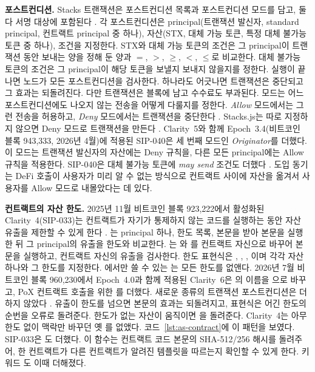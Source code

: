 \textbf{포스트컨디션.} Stacks 트랜잭션은 포스트컨디션 목록과 포스트컨디션 모드를 담고, 둘 다 서명 대상에 포함된다 \cite{sip005}. 각 포스트컨디션은 principal(트랜잭션 발신자, standard principal, 컨트랙트 principal 중 하나), 자산(STX, 대체 가능 토큰, 특정 대체 불가능 토큰 중 하나), 조건을 지정한다. STX와 대체 가능 토큰의 조건은 그 principal이 트랜잭션 동안 보내는 양을 정해 둔 양과 $=$, $>$, $\geq$, $<$, $\leq$로 비교한다. 대체 불가능 토큰의 조건은 그 principal이 해당 토큰을 보낼지 보내지 않을지를 정한다. 실행이 끝나면 노드가 모든 포스트컨디션을 검사한다. 하나라도 어긋나면 트랜잭션은 중단되고 그 효과는 되돌려진다. 다만 트랜잭션은 블록에 남고 수수료도 부과된다. 모드는 어느 포스트컨디션에도 나오지 않는 전송을 어떻게 다룰지를 정한다. \emph{Allow} 모드에서는 그런 전송을 허용하고, \emph{Deny} 모드에서는 트랜잭션을 중단한다 \cite{sip005}. Stacks.js는 따로 지정하지 않으면 Deny 모드로 트랜잭션을 만든다 \cite{hiropostconditions}. Clarity~5와 함께 Epoch~3.4(비트코인 블록 943,333, 2026년 4월)에 적용된 SIP-040은 세 번째 모드인 \emph{Originator}를 더했다. 이 모드는 트랜잭션 발신자의 자산에는 Deny 규칙을, 다른 모든 principal에는 Allow 규칙을 적용한다. SIP-040은 대체 불가능 토큰에 \emph{may send} 조건도 더했다 \cite{sip040,sip039}. 도입 동기는 DeFi 호출이 사용자가 미리 알 수 없는 방식으로 컨트랙트 사이에 자산을 옮겨서 사용자를 Allow 모드로 내몰았다는 데 있다.

\textbf{컨트랙트의 자산 한도.} 2025년 11월 비트코인 블록 923,222에서 활성화된 Clarity~4(SIP-033)는 컨트랙트가 자기가 통제하지 않는 코드를 실행하는 동안 자산 유출을 제한할 수 있게 한다 \cite{sip033}. 는 principal 하나, 한도 목록, 본문을 받아 본문을 실행한 뒤 그 principal의 유출을 한도와 비교한다. 는 와 를 컨트랙트 자신으로 바꾸어 본문을 실행하고, 컨트랙트 자신의 유출을 검사한다. 한도 표현식은 , , , 이며 각각 자산 하나와 그 한도를 지정한다. 에서만 쓸 수 있는 는 모든 한도를 없앤다. 2026년 7월 비트코인 블록 960,230에서 Epoch~4.0과 함께 적용된 Clarity~6은 의 이름을 으로 바꾸고, PoX 컨트랙트 호출을 위한 를 더했다. 새로운 종류의 트랜잭션 포스트컨디션은 더하지 않았다 \cite{sip044}. 유출이 한도를 넘으면 본문의 효과는 되돌려지고, 표현식은 어긴 한도의 순번을 오류로 돌려준다. 한도가 없는 자산이 움직이면 을 돌려준다. Clarity~4는 아무 한도 없이 맥락만 바꾸던 옛 를 없앴다. 코드~\ref{lst:as-contract}에 이 패턴을 보였다. SIP-033은 도 더했다. 이 함수는 컨트랙트 코드 본문의 SHA-512/256 해시를 돌려주어, 한 컨트랙트가 다른 컨트랙트가 알려진 템플릿을 따르는지 확인할 수 있게 한다. 키워드 도 이때 더해졌다.

